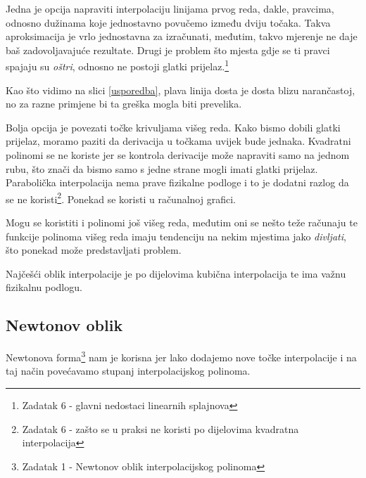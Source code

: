 \documentclass[12pt,a4paper]{report}
\begin{document}
	Jedna je opcija napraviti interpolaciju linijama prvog reda, dakle, pravcima, odnosno dužinama koje jednostavno povučemo između dviju točaka. Takva aproksimacija je vrlo jednostavna za izračunati, međutim, takvo mjerenje ne daje baš zadovoljavajuće rezultate\cite{ChEn2450}. Drugi je problem što mjesta gdje se ti pravci spajaju su \textit{oštri}, odnosno ne postoji glatki prijelaz.\footnote{Zadatak 6 - glavni nedostaci linearnih splajnova}
	
	Kao što vidimo na slici \ref{usporedba}, plava linija dosta je dosta blizu narančastoj, no za razne primjene bi ta greška mogla biti prevelika.
	
	Bolja opcija je povezati točke krivuljama višeg reda. Kako bismo dobili glatki prijelaz, moramo paziti da derivacija u točkama uvijek bude jednaka. Kvadratni polinomi se ne koriste jer se kontrola derivacije može napraviti samo na jednom rubu, što znači da bismo samo s jedne strane mogli imati glatki prijelaz. Parabolička interpolacija nema prave fizikalne podloge i to je dodatni razlog da se ne koristi\footnote{Zadatak 6 - zašto se u praksi ne koristi po dijelovima kvadratna interpolacija}. Ponekad se koristi u računalnoj grafici.\cite{hari} 
	
	Mogu se koristiti i polinomi još višeg reda, međutim oni se nešto teže računaju te funkcije polinoma višeg reda imaju tendenciju na nekim mjestima jako \textit{divljati}, što ponekad može predstavljati problem\cite{ChEn2450}. 
	
	Najčešći oblik interpolacije je po dijelovima kubična interpolacija te ima važnu fizikalnu podlogu\cite{hari}.
	\subsection{Newtonov oblik \cite{hari}}
	Newtonova forma\footnote{Zadatak 1 - Newtonov oblik interpolacijskog polinoma} nam je korisna jer lako dodajemo nove točke interpolacije i na taj način povećavamo stupanj interpolacijskog polinoma. 
	
\end{document}
